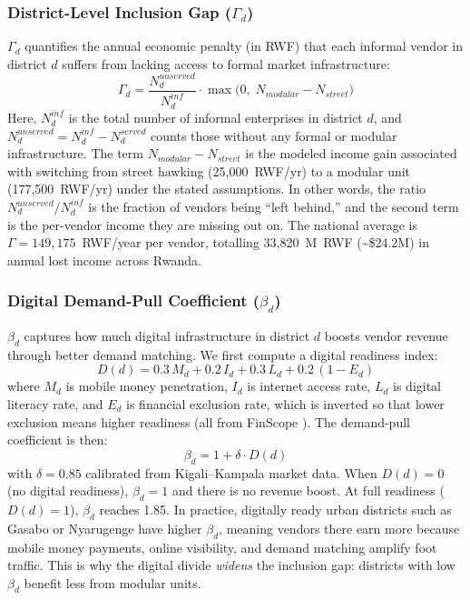 \documentclass{article}
\begin{document}
\subsubsection{District-Level Inclusion Gap ($\Gamma_d$)}
$\Gamma_d$ quantifies the annual economic penalty (in RWF) that each informal vendor in district $d$ suffers from lacking access to formal market infrastructure:
\begin{equation}
    \Gamma_d = \frac{N_d^{\textit{unserved}}}{N_d^{\textit{inf}}} \cdot \max\!\bigl(0,\; N_{\textit{modular}} - N_{\textit{street}}\bigr)
    \label{eq:gamma}
\end{equation}
Here, $N_d^{\textit{inf}}$ is the total number of informal enterprises in district $d$, and $N_d^{\textit{unserved}} = N_d^{\textit{inf}} - N_d^{\textit{served}}$ counts those without any formal or modular infrastructure.
The term $N_{\textit{modular}} - N_{\textit{street}}$ is the modeled income gain associated with switching from street hawking (25,000~RWF/yr) to a modular unit (177,500~RWF/yr) under the stated assumptions.
In other words, the ratio $N_d^{\textit{unserved}} / N_d^{\textit{inf}}$ is the fraction of vendors being ``left behind,'' and the second term is the per-vendor income they are missing out on.
The national average is $\Gamma = 149{,}175$~RWF/year per vendor, totalling 33,820~M~RWF (\textasciitilde\$24.2M) in annual lost income across Rwanda.

\subsubsection{Digital Demand-Pull Coefficient ($\beta_d$)}
$\beta_d$ captures how much digital infrastructure in district $d$ boosts vendor revenue through better demand matching.
We first compute a digital readiness index:
\begin{equation}
    D(d) = 0.3\,M_d + 0.2\,I_d + 0.3\,L_d + 0.2\,(1 - E_d)
    \label{eq:digital}
\end{equation}
where $M_d$ is mobile money penetration, $I_d$ is internet access rate, $L_d$ is digital literacy rate, and $E_d$ is financial exclusion rate, which is inverted so that lower exclusion means higher readiness (all from FinScope \cite{finscope2020rwanda}).
The demand-pull coefficient is then:
\begin{equation}
    \beta_d = 1 + \delta \cdot D(d)
    \label{eq:beta}
\end{equation}
with $\delta = 0.85$ calibrated from Kigali--Kampala market data.
When $D(d) = 0$ (no digital readiness), $\beta_d = 1$ and there is no revenue boost.
At full readiness ($D(d) = 1$), $\beta_d$ reaches 1.85.
In practice, digitally ready urban districts such as Gasabo or Nyarugenge have higher $\beta_d$, meaning vendors there earn more because mobile money payments, online visibility, and demand matching amplify foot traffic.
This is why the digital divide \emph{widens} the inclusion gap: districts with low $\beta_d$ benefit less from modular units.
\end{document}

